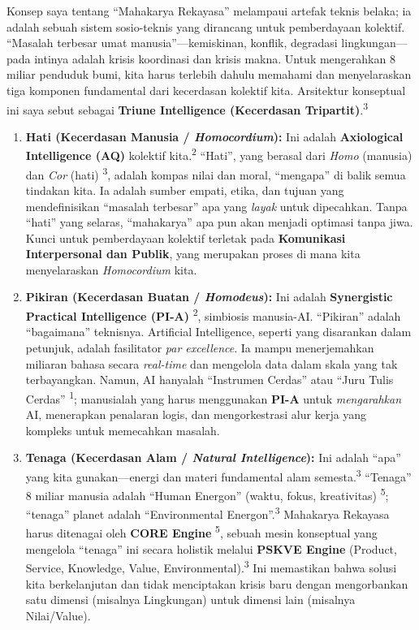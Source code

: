 \documentclass[
  letterpaper,
  DIV=11,
  numbers=noendperiod]{scrreprt}
\begin{document}
Konsep saya tentang ``Mahakarya Rekayasa'' melampaui artefak teknis
belaka; ia adalah sebuah sistem sosio-teknis yang dirancang untuk
pemberdayaan kolektif. ``Masalah terbesar umat manusia''---kemiskinan,
konflik, degradasi lingkungan---pada intinya adalah krisis koordinasi
dan krisis makna. Untuk mengerahkan 8 miliar penduduk bumi, kita harus
terlebih dahulu memahami dan menyelaraskan tiga komponen fundamental
dari kecerdasan kolektif kita. Arsitektur konseptual ini saya sebut
sebagai \textbf{Triune Intelligence (Kecerdasan
Tripartit)}.\textsuperscript{3}

\begin{enumerate}
\def\labelenumi{\arabic{enumi}.}
\item
  \textbf{Hati (Kecerdasan Manusia / \emph{Homocordium}):} Ini adalah
  \textbf{Axiological Intelligence (AQ)} kolektif
  kita.\textsuperscript{2} ``Hati'', yang berasal dari \emph{Homo}
  (manusia) dan \emph{Cor} (hati) \textsuperscript{3}, adalah kompas
  nilai dan moral, ``mengapa'' di balik semua tindakan kita. Ia adalah
  sumber empati, etika, dan tujuan yang mendefinisikan ``masalah
  terbesar'' apa yang \emph{layak} untuk dipecahkan. Tanpa ``hati'' yang
  selaras, ``mahakarya'' apa pun akan menjadi optimasi tanpa jiwa. Kunci
  untuk pemberdayaan kolektif terletak pada \textbf{Komunikasi
  Interpersonal dan Publik}, yang merupakan proses di mana kita
  menyelaraskan \emph{Homocordium} kita.
\item
  \textbf{Pikiran (Kecerdasan Buatan / \emph{Homodeus}):} Ini adalah
  \textbf{Synergistic Practical Intelligence (PI-A)}
  \textsuperscript{2}, simbiosis manusia-AI. ``Pikiran'' adalah
  ``bagaimana'' teknisnya. Artificial Intelligence, seperti yang
  disarankan dalam petunjuk, adalah fasilitator \emph{par excellence}.
  Ia mampu menerjemahkan miliaran bahasa secara \emph{real-time} dan
  mengelola data dalam skala yang tak terbayangkan. Namun, AI hanyalah
  ``Instrumen Cerdas'' atau ``Juru Tulis Cerdas'' \textsuperscript{1};
  manusialah yang harus menggunakan \textbf{PI-A} untuk
  \emph{mengarahkan} AI, menerapkan penalaran logis, dan mengorkestrasi
  alur kerja yang kompleks untuk memecahkan masalah.
\item
  \textbf{Tenaga (Kecerdasan Alam / \emph{Natural Intelligence}):} Ini
  adalah ``apa'' yang kita gunakan---energi dan materi fundamental alam
  semesta.\textsuperscript{3} ``Tenaga'' 8 miliar manusia adalah ``Human
  Energon'' (waktu, fokus, kreativitas) \textsuperscript{5}; ``tenaga''
  planet adalah ``Environmental Energon''.\textsuperscript{3} Mahakarya
  Rekayasa harus ditenagai oleh \textbf{CORE Engine}
  \textsuperscript{5}, sebuah mesin konseptual yang mengelola ``tenaga''
  ini secara holistik melalui \textbf{PSKVE Engine} (Product, Service,
  Knowledge, Value, Environmental).\textsuperscript{3} Ini memastikan
  bahwa solusi kita berkelanjutan dan tidak menciptakan krisis baru
  dengan mengorbankan satu dimensi (misalnya Lingkungan) untuk dimensi
  lain (misalnya Nilai/Value).
\end{enumerate}
\end{document}
